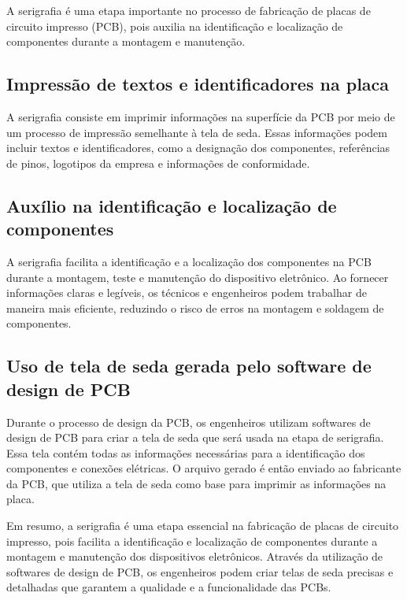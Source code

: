 A serigrafia é uma etapa importante no processo de fabricação de placas de circuito impresso (PCB), pois auxilia na identificação e localização de componentes durante a montagem e manutenção.

\hypertarget{impressuxe3o-de-textos-e-identificadores-na-placa}{%
\subsection{Impressão de textos e identificadores na placa}\label{impressuxe3o-de-textos-e-identificadores-na-placa}}

A serigrafia consiste em imprimir informações na superfície da PCB por meio de um processo de impressão semelhante à tela de seda. Essas informações podem incluir textos e identificadores, como a designação dos componentes, referências de pinos, logotipos da empresa e informações de conformidade.

\hypertarget{auxuxedlio-na-identificauxe7uxe3o-e-localizauxe7uxe3o-de-componentes}{%
\subsection{Auxílio na identificação e localização de componentes}\label{auxuxedlio-na-identificauxe7uxe3o-e-localizauxe7uxe3o-de-componentes}}

A serigrafia facilita a identificação e a localização dos componentes na PCB durante a montagem, teste e manutenção do dispositivo eletrônico. Ao fornecer informações claras e legíveis, os técnicos e engenheiros podem trabalhar de maneira mais eficiente, reduzindo o risco de erros na montagem e soldagem de componentes.

\hypertarget{uso-de-tela-de-seda-gerada-pelo-software-de-design-de-pcb}{%
\subsection{Uso de tela de seda gerada pelo software de design de PCB}\label{uso-de-tela-de-seda-gerada-pelo-software-de-design-de-pcb}}

Durante o processo de design da PCB, os engenheiros utilizam softwares de design de PCB para criar a tela de seda que será usada na etapa de serigrafia. Essa tela contém todas as informações necessárias para a identificação dos componentes e conexões elétricas. O arquivo gerado é então enviado ao fabricante da PCB, que utiliza a tela de seda como base para imprimir as informações na placa.

Em resumo, a serigrafia é uma etapa essencial na fabricação de placas de circuito impresso, pois facilita a identificação e localização de componentes durante a montagem e manutenção dos dispositivos eletrônicos. Através da utilização de softwares de design de PCB, os engenheiros podem criar telas de seda precisas e detalhadas que garantem a qualidade e a funcionalidade das PCBs.

